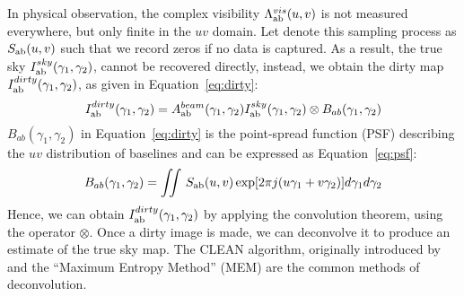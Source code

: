 In physical observation, the complex visibility $\Lambda_{\rm ab}^{vis}(u, v)$ is not measured everywhere, but only finite in the $uv$ domain.
Let denote this sampling process as $S_{\rm ab}(u, v)$
such that we record zeros if no data is captured. As a result, the true sky $I_{\rm ab}^{sky}(\gamma_1,  \gamma_2)$,  cannot be recovered directly, instead, we obtain the dirty map $I_{\rm ab}^{dirty}(\gamma_1,  \gamma_2)$,
as given in Equation~\ref{eq:dirty}:
  \begin{equation} \label{eq:dirty}
 I_{\rm ab}^{dirty}(\gamma_1,  \gamma_2) =  A_{\rm ab}^{beam}(\gamma_1,  \gamma_2)I_{\rm ab}^{sky}(\gamma_1,  \gamma_2) \otimes B_{ab}(\gamma_1,  \gamma_2)       %
\end{equation}
 $B_{ab}(\gamma_1,  \gamma_2)$ in Equation~\ref{eq:dirty}  is the point-spread function (PSF) describing the $uv$ distribution of baselines and can be expressed as Equation~\ref{eq:psf}:
  \begin{equation} \label{eq:psf}
 B_{ab}(\gamma_1,  \gamma_2) =  \iint\, S_{\rm ab}(u, v)\exp[2\pi j (u\gamma_1 + v\gamma_2)] d\gamma_1 d \gamma_2 
\end{equation}
 Hence, we can obtain $I_{\rm ab}^{dirty}(\gamma_1,  \gamma_2)$ by applying the convolution theorem, using the operator $\otimes$. Once a dirty image is made,
 we can deconvolve it to produce an estimate of the true sky map.  The CLEAN algorithm, originally introduced by \citep{hogbom1974aperture} and 
 the \enquote{Maximum Entropy Method} (MEM) \citep{carcamo2018multi} are the common methods of deconvolution.
 

